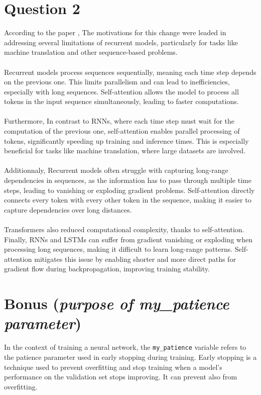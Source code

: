 \documentclass[a4paper]{article}
\begin{document}
\section*{Question 2}
\noindent
According to the paper \cite{vaswani2023attentionneed}, The motivations for this
change were leaded in addressing several limitations of recurrent models, particularly for
tasks like machine translation and other sequence-based problems.
\\
\\
\noindent
Recurrent models process sequences sequentially, meaning each time step depends on the previous
one. This limits parallelism and can lead to inefficiencies, especially with long sequences.
Self-attention allows the model to process all tokens in the input sequence simultaneously,
leading to faster computations.
\\
\\
\noindent
Furthermore, In contrast to RNNs, where each time step must wait for the computation
of the previous one, self-attention enables parallel processing of tokens, significantly
speeding up training and inference times. This is especially beneficial for tasks like
machine translation, where large datasets are involved.
\\
\\
\noindent
Additionnaly, Recurrent models often struggle with capturing long-range
dependencies in sequences, as the information has to pass through multiple
time steps, leading to vanishing or exploding gradient problems. Self-attention
directly connects every token with every other token in the sequence, making it easier
to capture dependencies over long distances.
\\
\\
\noindent
Transformers also reduced computational complexity, thanks to self-attention. Finally,
RNNs and LSTMs can suffer from gradient vanishing or exploding when processing long sequences,
making it difficult to learn long-range patterns. Self-attention mitigates this issue by
enabling shorter and more direct paths for gradient flow during backpropagation, improving
training stability.


\section*{Bonus (\textit{purpose of my\_patience parameter})}
\noindent
In the context of training a neural network, the \texttt{my\_patience} variable refers to
the patience parameter used in early stopping during training. Early stopping is a
technique used to prevent overfitting and stop training when a model’s performance on
the validation set stops improving. It can prevent also from overfitting.
\end{document}
